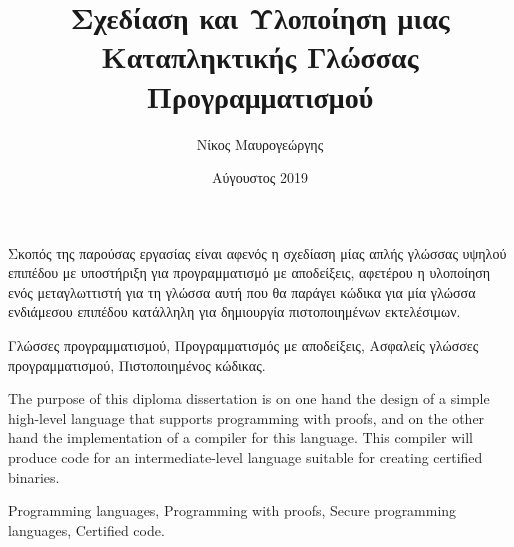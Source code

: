 \documentclass[diploma]{softlab-thesis}
\begin{document}

\frontmatter

\title{Σχεδίαση και Υλοποίηση μιας Καταπληκτικής Γλώσσας Προγραμματισμού}
\author{Νίκος Μαυρογεώργης}
\date{Αύγουστος 2019}




\maketitle



\begin{abstractgr}%
  Σκοπός της παρούσας εργασίας είναι αφενός η σχεδίαση μίας απλής
  γλώσσας υψηλού επιπέδου με υποστήριξη για προγραμματισμό με
  αποδείξεις, αφετέρου η υλοποίηση ενός μεταγλωττιστή για τη γλώσσα
  αυτή που θα παράγει κώδικα για μία γλώσσα ενδιάμεσου επιπέδου
  κατάλληλη για δημιουργία πιστοποιημένων εκτελέσιμων.

\begin{keywordsgr}
  Γλώσσες προγραμματισμού,
  Προγραμματισμός με αποδείξεις,
  Ασφαλείς γλώσσες προγραμματισμού,
  Πιστοποιημένος κώδικας.
\end{keywordsgr}
\end{abstractgr}



\begin{abstracten}%
  The purpose of this diploma dissertation is on one hand the design
  of a simple high-level language that supports programming with
  proofs, and on the other hand the implementation of a compiler for
  this language. This compiler will produce code for an
  intermediate-level language suitable for creating certified
  binaries.

  \begin{keywordsen}
  Programming languages,
  Programming with proofs,
  Secure programming languages,
  Certified code.
\end{keywordsen}
\end{abstracten}
\end{document}
